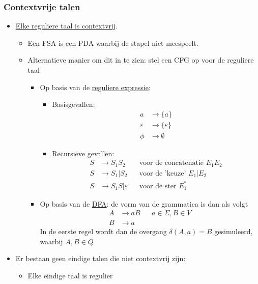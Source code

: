 \documentclass[kulak]{kulakarticle}
\let\epsilon\varepsilon
\theoremstyle{definition}
\begin{document}
		\newpage

	\subsubsection*{Contextvrije talen}

	\begin{itemize}
		\item \underline{Elke reguliere taal is contextvrij}. \begin{itemize}
			\item Een FSA is een PDA waarbij de stapel niet meespeelt.
			\item Alternatieve manier om dit in te zien: stel een CFG op voor de reguliere taal \begin{itemize}
				\item Op basis van de \underline{reguliere expressie}: \begin{itemize}
					\item Basisgevallen: \begin{align*}
						a &\rightarrow \{a\}\\
						\epsilon &\rightarrow \{\epsilon\}\\
						\phi &\rightarrow \emptyset
					\end{align*}
					\item Recursieve gevallen: \begin{align*}
						S & \rightarrow S_1S_2 && \text{voor de concatenatie } E_1E_2\\
						S & \rightarrow S_1 | S_2 && \text{voor de 'keuze' } E_1|E_2\\
						S & \rightarrow S_1S | \epsilon && \text{voor de ster } E_1^*
					\end{align*}
				\end{itemize}
				\item Op basis van de \underline{DFA}: de vorm van de grammatica is dan als volgt \begin{align*}
					A & \rightarrow aB && a \in \Sigma, B \in V\\
					B & \to a
				\end{align*} In de eerste regel wordt dan de overgang \(\delta(A,a)=B\) gesimuleerd, waarbij \(A,B \in Q\)
			\end{itemize}
		\end{itemize}
		\item Er bestaan geen eindige talen die niet contextvrij zijn:\begin{itemize}
			\item Elke eindige taal is regulier

\end{itemize}
\end{itemize}
\end{document}
